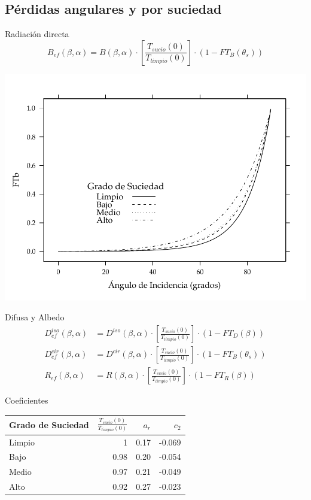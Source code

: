 \documentclass[xcolor={usenames,svgnames,dvipsnames}]{beamer}
\begin{document}
\subsection{Pérdidas angulares y por suciedad}
\label{sec:orgd712167}

\begin{frame}[label={sec:org32537b8}]{Radiación directa}
\[B_{ef}(\beta,\alpha)=B(\beta,\alpha)\cdot\left[\frac{T_{sucio}(0)}{T_{limpio}(0)}\right]\cdot (1-FT_{B}(\theta_{s}))\]

\begin{center}
\includegraphics[width=.9\linewidth]{../figs/Suciedad.pdf}
\end{center}
\end{frame}

\begin{frame}[label={sec:org7828d8e}]{Difusa y Albedo}
\begin{align*}
D_{ef}^{iso}(\beta,\alpha) &= D^{iso}(\beta,\alpha)\cdot\left[\frac{T_{sucio}(0)}{T_{limpio}(0)}\right]\cdot(1-FT_{D}(\beta))\\
D_{ef}^{cir}(\beta,\alpha) &= D^{cir}(\beta,\alpha)\cdot\left[\frac{T_{sucio}(0)}{T_{limpio}(0)}\right]\cdot(1-FT_{B}(\theta_{s}))\\
R_{ef}(\beta,\alpha) &= R(\beta,\alpha)\cdot\left[\frac{T_{sucio}(0)}{T_{limpio}(0)}\right]\cdot(1-FT_{R}(\beta))
\end{align*}
\end{frame}
\begin{frame}[label={sec:orgd2f48cc}]{Coeficientes}
\begin{center}
\begin{tabular}{lrrr}
Grado de Suciedad & \(\frac{T_{sucio}(0)}{T_{limpio}(0)}\) & \(a_{r}\) & \(c_{2}\)\\
\hline
Limpio & 1 & 0.17 & -0.069\\
Bajo & 0.98 & 0.20 & -0.054\\
Medio & 0.97 & 0.21 & -0.049\\
Alto & 0.92 & 0.27 & -0.023\\
\end{tabular}
\end{center}
\end{frame}
\end{document}
